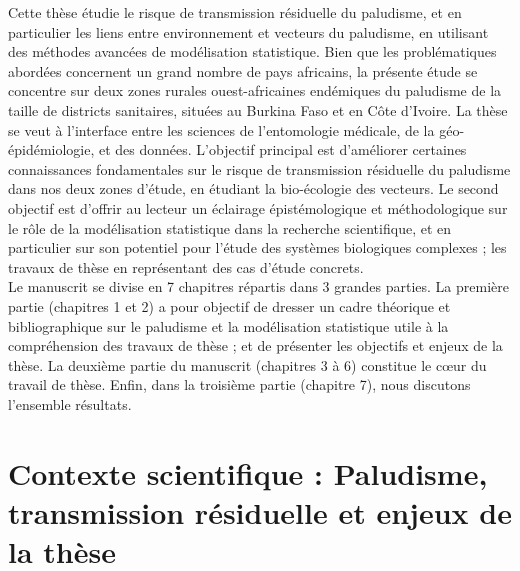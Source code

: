 \documentclass[12pt,twoside]{reedthesis}
\begin{document}
Cette thèse étudie le risque de transmission résiduelle du paludisme, et en particulier les liens entre environnement et vecteurs du paludisme, en utilisant des méthodes avancées de modélisation statistique. Bien que les problématiques abordées concernent un grand nombre de pays africains, la présente étude se concentre sur deux zones rurales ouest-africaines endémiques du paludisme de la taille de districts sanitaires, situées au Burkina Faso et en Côte d'Ivoire. La thèse se veut à l'interface entre les sciences de l'entomologie médicale, de la géo-épidémiologie, et des données. L'objectif principal est d'améliorer certaines connaissances fondamentales sur le risque de transmission résiduelle du paludisme dans nos deux zones d'étude, en étudiant la bio-écologie des vecteurs. Le second objectif est d'offrir au lecteur un éclairage épistémologique et méthodologique sur le rôle de la modélisation statistique dans la recherche scientifique, et en particulier sur son potentiel pour l'étude des systèmes biologiques complexes ; les travaux de thèse en représentant des cas d'étude concrets.\\

Le manuscrit se divise en 7 chapitres répartis dans 3 grandes parties. La première partie (chapitres 1 et 2) a pour objectif de dresser un cadre théorique et bibliographique sur le paludisme et la modélisation statistique utile à la compréhension des travaux de thèse ; et de présenter les objectifs et enjeux de la thèse. La deuxième partie du manuscrit (chapitres 3 à 6) constitue le cœur du travail de thèse. Enfin, dans la troisième partie (chapitre 7), nous discutons l'ensemble résultats.



\begingroup 
\renewcommand{\headrulewidth}{0pt}

\markboth{}{}


\endgroup

\hypertarget{chapitre-1}{%
\chapter{Contexte scientifique : Paludisme, transmission résiduelle et enjeux de la thèse}\label{chapitre-1}}
\end{document}
